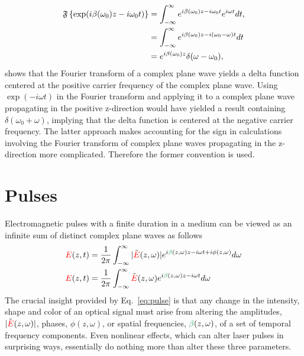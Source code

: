 \begin{align}
    \mathfrak{F}\left\{\exp(i\beta(\omega_0)z-i\omega_0 t)\right\} &= \int_{-\infty}^{\infty} e^{i\beta(\omega_0)z-i\omega_0 t} e^{i\omega t} dt, \\ \nonumber
      &= \int_{-\infty}^{\infty} e^{i\beta(\omega_0)z-i(\omega_0-\omega) t} dt \\ \nonumber
      &= e^{i\beta(\omega_0)z}\delta(\omega-\omega_0),
\end{align} 
shows that the Fourier transform of a complex plane wave yields a delta function centered at the positive carrier frequency of the complex plane wave. Using $\exp(-i\omega t)$ in the Fourier transform and applying it to a complex plane wave propagating in the positive z-direction would have yielded a result containing $\delta(\omega_0+\omega)$, implying that the delta function is centered at the negative carrier frequency. The latter approach makes accounting for the sign in calculations involving the Fourier transform of complex plane waves propagating in the z-direction more complicated. Therefore the former convention is used. 

\section{Pulses}
Electromagnetic pulses with a finite duration in a medium can be viewed as an infinite sum of distinct complex plane waves as follows
\begin{align}
    \label{eq:pulse}
    \E(z,t) &= \frac{1}{2\pi}\int_{-\infty}^{\infty} |\Tilde{\E}(z,\omega)| e^{i\betag(z,\omega)z-i\omega t+i\phi(z,\omega)} d\omega \\ \nonumber
    \E(z,t) &= \frac{1}{2\pi}\int_{-\infty}^{\infty} \Tilde{\E}(z,\omega) e^{i\betag(z,\omega)z-i\omega t} d\omega
\end{align}
The crucial insight provided by Eq.~\ref{eq:pulse} is that any change in the intensity, shape and color of an optical signal must arise from altering the amplitudes, $|\Tilde{\textcolor{red}{E}}(z,\omega)|$, phases, $\phi(z,\omega)$, or spatial frequencies, $\betag(z,\omega)$, of a set of temporal frequency components. Even nonlinear effects, which can alter laser pulses in surprising ways, essentially do nothing more than alter these three parameters. 



